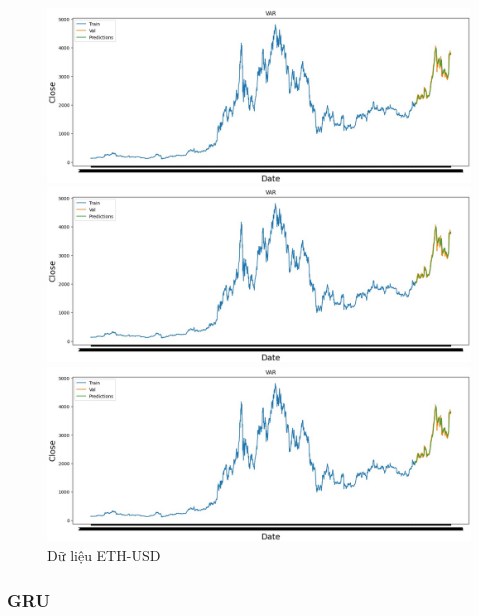 \documentclass[conference]{IEEEtran}
\begin{document}
	\begin{figure}[H]
		\centering
		\begin{minipage}{0.15\textwidth}
			\centering
			\includegraphics[width=1\textwidth]{Figure/ETH_VAR.jpg}
		\end{minipage}
		\hfill
		\begin{minipage}{0.15\textwidth}
			\centering
			\includegraphics[width=1\textwidth]{Figure/ETH_VAR.jpg}
		\end{minipage}
		\hfill
		\begin{minipage}{0.15\textwidth}
			\centering
			\includegraphics[width=1\textwidth]{Figure/ETH_VAR.jpg}
		\end{minipage}
		\caption{Dữ liệu ETH-USD}
		\label{fig:1}
	\end{figure}
	
	\subsubsection{GRU}
\end{document}
